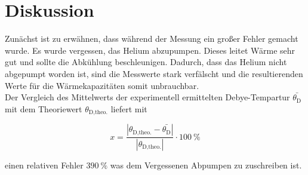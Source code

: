 \section{Diskussion}
\label{sec:Diskussion}

Zunächst ist zu erwähnen, dass während der Messung ein großer Fehler gemacht wurde. Es wurde vergessen, das Helium abzupumpen. Dieses leitet 
Wärme sehr gut und sollte die Abkühlung beschleunigen. Dadurch, dass das Helium nicht abgepumpt worden ist, sind die Messwerte stark verfälscht 
und die resultierenden Werte für die Wärmekapazitäten somit unbrauchbar.\\

Der Vergleich des Mittelwerts der experimentell ermittelten Debye-Tempartur $\bar{\theta_\text{D}}$ mit dem Theoriewert 
$\theta_\text{D,theo.}$ liefert mit 

\begin{equation*}
    x = \frac{|\theta_\text{D,theo.}-\bar{\theta_\text{D}}|}{|\theta_\text{D,theo.}|}\cdot \SI{100}{\percent}
\end{equation*}

einen relativen Fehler $\SI{390}{\percent}$ was dem Vergessenen Abpumpen zu zuschreiben ist. 